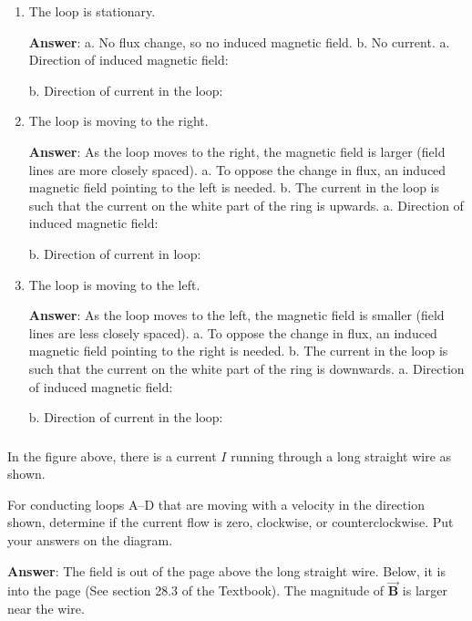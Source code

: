 \documentclass{article}
\newcommand{\bfvec}[1]{\vec{\mathbf{#1}}}
\begin{document}
\begin{enumerate}

  \item The loop is stationary.

        \ifsolutions
        {\bf Answer}: a. No flux change, so no induced magnetic field. b. No current.
        \else
        a. Direction of induced magnetic field:

        b. Direction of current in the loop:
        \fi

  \item The loop is moving to the right.

        \ifsolutions
        {\bf Answer}: As the loop moves to the right, the magnetic field is larger (field lines are more closely spaced). a. To oppose the change in flux, an induced magnetic field pointing to the left is needed. b. The current in the loop is such that the current on the white part of the ring is upwards.
        \else
        a. Direction of induced magnetic field:

        b. Direction of current in loop:
        \fi

  \item The loop is moving to the left.

        \ifsolutions
        {\bf Answer}: As the loop moves to the left, the magnetic field is smaller (field lines are less closely spaced). a. To oppose the change in flux, an induced magnetic field pointing to the right is needed. b. The current in the loop is such that the current on the white part of the ring is downwards.
        \else
        a. Direction of induced magnetic field:

        b. Direction of current in the loop:
        \fi

\end{enumerate}

\subsubsection{}



In the figure above, there is a current $I$ running through a long straight wire as shown.

For conducting loops A--D that are moving with a velocity in the direction shown, determine if the current flow is zero, clockwise, or counterclockwise. Put your answers on the diagram.

\ifsolutions
{\bf Answer}: The field is out of the page above the long straight wire. Below, it is into the page (See section 28.3 of the Textbook). The magnitude of $\bfvec{B}$ is larger near the wire.
\end{document}
